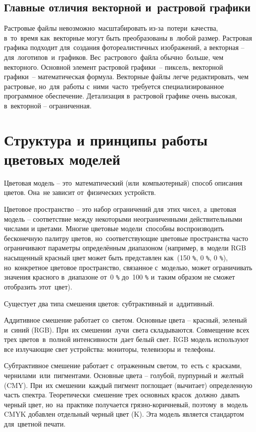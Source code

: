 \documentclass{ou}
\begin{document}
\subsection{Главные отличия векторной и~растровой графики}
Растровые файлы невозможно~масштабировать из-за~потери~качества, в~то~время как~векторные могут быть преобразованы в~любой размер. Растровая графика подходит для~создания фотореалистичных изображений, а векторная -- для~логотипов~и~графиков. Вес~растрового~файла обычно~больше, чем векторного. Основной элемент растровой графики~-- пиксель, векторной графики~-- математическая формула. Векторные файлы легче редактировать, чем растровые, но~для~работы с~ними~часто~требуется специализированное программное обеспечение. Детализация в~растровой графике очень высокая, в~векторной -- ограниченная.
\newpage
\section{Структура и принципы работы цветовых моделей}
Цветовая модель -- это~математический (или~компьютерный) способ описания цветов. Она~не зависит от~физических устройств.

Цветовое пространство -- это набор ограничений для~этих чисел, а~цветовая модель -- соответствие между некоторыми неограниченными действительными числами и цветами. Многие цветовые модели~способны воспроизводить бесконечную палитру цветов, но~соответствующие цветовые пространства часто ограничивают параметры определённым диапазоном (например, в~модели RGB насыщенный красный цвет может быть представлен как~(150 \verb|%|, 0 \verb|%|, 0 \verb|%|), но~конкретное цветовое пространство, связанное с~моделью, может ограничивать значения красного в~диапазоне от~0 \verb|%| до~100 \verb|%| и~таким образом не сможет отобразить этот~цвет).

Сущестует два типа смешения цветов: субтрактивный и~аддитивный.

Аддитивное смешение работает со~светом. Основные цвета -- красный, зеленый и~синий (RGB). При~их смешении~лучи~света складываются. Совмещение всех трех цветов~в~полной интенсивности~дает белый свет. RGB модель используют все излучающие свет устройства: мониторы, телевизоры и~телефоны.

Субтрактивное смешение работает с~отраженным светом, то~есть с~красками, чернилами~или~пигментами. Основные цвета -- голубой, пурпурный и~желтый (CMY). При~их смешении~каждый пигмент поглощает (вычитает) определенную часть спектра. Теоретически~смешение трех основных красок~должно~давать черный цвет, но~на~практике получается грязно-коричневый, поэтому~в~модель CMYK добавлен отдельный черный цвет (K). Эта модель является стандартом для~цветной печати.
\end{document}

